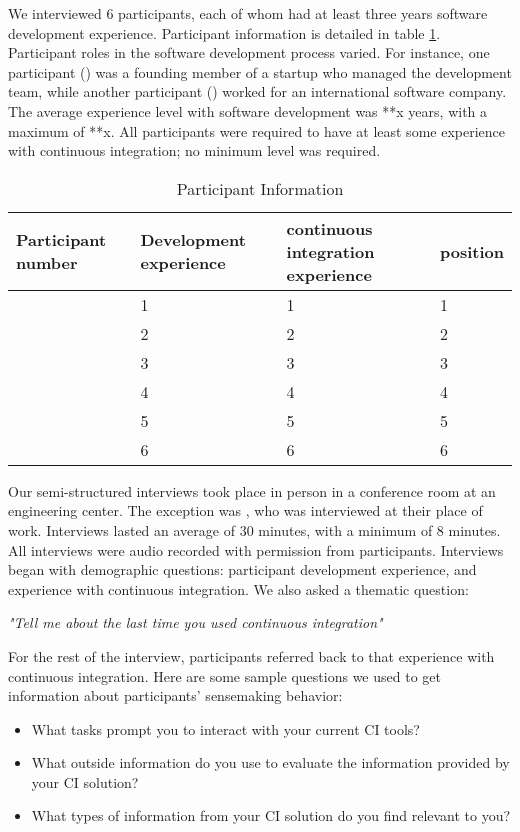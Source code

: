 \documentclass{sig-alternate}
\begin{document}
We interviewed 6 participants, each of whom had at least three years software development experience. Participant information is detailed in table \ref{table:participant}. Participant roles in the software development process varied. For instance, one participant (\cpg) was a founding member of a startup who managed the development team, while another participant (\david) worked for an international software company. The average experience level with software development was **x years, with a maximum of **x. All participants were required to have at least some experience with continuous integration; no minimum level was required.
\begin{table}
\centering
\label{table:participant}
\caption{Participant Information}
\begin{tabular}{ | p{} | p{} | p{} | p{} | }\hline
	Participant number & Development experience & continuous integration experience & position \\ \hline
	\michael & 1 & 1 & 1 \\ \hline
	\sruti & 2 & 2 & 2 \\ \hline
	\caius & 3 & 3 & 3 \\ \hline
	\srutitwo & 4 & 4 & 4 \\ \hline
	\david & 5 & 5 & 5 \\ \hline
	\cpg & 6 & 6 & 6 \\ \hline
\end{tabular}
\end{table}
Our semi-structured interviews took place in person in a conference room at an engineering center. The exception was \cpg, who was interviewed at their place of work. Interviews lasted an average of 30 minutes, with a minimum of 8 minutes. All interviews were audio recorded with permission from participants.  Interviews began with demographic questions: participant development experience, and experience with continuous integration. We also asked a thematic question:

\smallskip
\textit{"Tell me about the last time you used continuous integration"}


For the rest of the interview, participants referred back to that experience with continuous integration. Here are some sample questions we used to get information about participants' sensemaking behavior:
\begin{itemize}  
	\item What tasks prompt you to interact with your current CI tools?
	\item What outside information do you use to evaluate the information provided by your CI solution?
	\item What types of information from your CI solution do you find relevant to you? 
\end{itemize}
\end{document}
